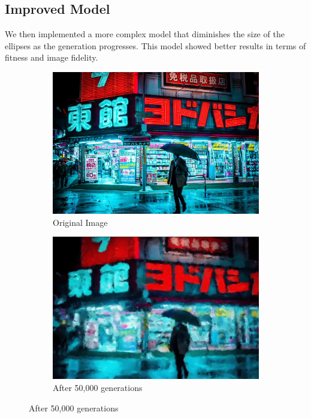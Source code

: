 \documentclass[10pt, conference]{IEEEtran}
\begin{document}
\subsection*{
	Improved Model
}
We then implemented a more complex model that diminishes the size of the ellipses as the generation progresses. This model showed better results in terms of fitness and image fidelity.

\begin{figure}[h!]
	\centering
	\begin{subfigure}{0.4\linewidth}
		\centering
		\includegraphics[width=\linewidth]{cbpunk.jpg}
		\caption{Original Image}
	\end{subfigure}%
	\hfill
	\begin{subfigure}{0.4\linewidth}
		\centering
		\includegraphics[width=\linewidth]{Screenshot 2025-01-02 172200.png}
		\caption{After 50,000 generations}

\end{subfigure}
\end{figure}
\end{document}
